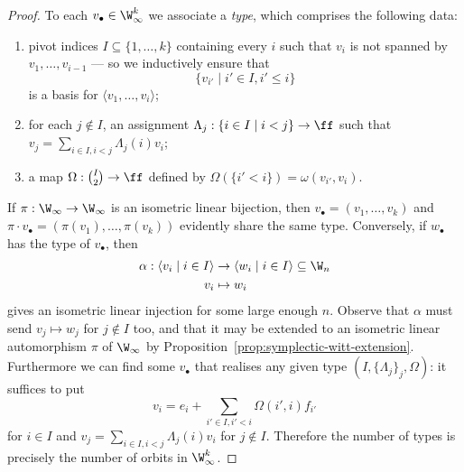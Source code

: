 \begin{proof}
    To each $v_\bullet \in \W_\infty^k$ we associate a \emph{type}, 
    which comprises the following data:
    \begin{enumerate}
        \item 
        pivot indices $I \subseteq \{1, \ldots, k\}$ containing every $i$ 
        such that $v_i$ is not spanned by $v_1, \ldots, v_{i-1}$
        --- so we inductively ensure that $$\{v_{i'} \mid i' \in I, i' \leq i\}$$ is a basis for $\langle v_1, \ldots, v_i \rangle$;

        \item 
        for each $j \not\in I$, an assignment $\Lambda_j : \{i \in I \mid i < j\} \to \ff$
        such that $v_j = \sum_{i \in I, i < j} \Lambda_j(i) v_i$;

        \item 
        a map $\Omega : \binom{I}{2} \to \ff$ defined by $\Omega(\{i' < i\}) = \omega(v_{i'}, v_{i})$.
    \end{enumerate}
    If $\pi : \W_\infty \to \W_\infty$ is an isometric linear bijection,
    then $v_\bullet = (v_1, \ldots, v_k)$ and $\pi \cdot v_\bullet = (\pi(v_1), \ldots, \pi(v_k))$ evidently share the same type.
    Conversely, if $w_\bullet$ has the type of $v_\bullet$,
    then
    \begin{align*}
        \alpha : \langle v_i \mid i \in I \rangle 
        &\to \langle w_i \mid i \in I \rangle 
        \subseteq \W_n \\
        v_i &\mapsto w_i
    \end{align*}
    gives an isometric linear injection for some large enough $n$.
    Observe that $\alpha$ must send $v_j \mapsto w_j$ for $j \not\in I$ too,
    and that it may be extended to an isometric linear automorphism $\pi$ of $\W_\infty$ by Proposition~\ref{prop:symplectic-witt-extension}.
    Furthermore we can find some $v_\bullet$ that realises any given type $(I, \{\Lambda_j\}_j, \Omega)$:
    it suffices to put
    \[
        v_i = e_i + \sum_{i' \in I, i' < i} \Omega(i', i) f_{i'}
    \]
    for $i \in I$ and $v_j = \sum_{i \in I, i < j} \Lambda_j(i) v_i$ for $j \not\in I$.
    Therefore the number of types is precisely the number of orbits in $\W_\infty^k$.


\end{proof}
